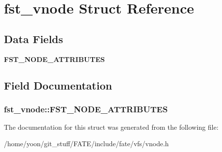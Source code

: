 \hypertarget{structfst__vnode}{\section{fst\-\_\-vnode Struct Reference}
\label{structfst__vnode}
}
\subsection*{Data Fields}
\begin{DoxyCompactItemize}
\item 
\hypertarget{structfst__vnode_a05e54cfa77aa3c8de48035e291c1b0a8}{{\bfseries F\-S\-T\-\_\-\-N\-O\-D\-E\-\_\-\-A\-T\-T\-R\-I\-B\-U\-T\-E\-S}}\label{structfst__vnode_a05e54cfa77aa3c8de48035e291c1b0a8}

\end{DoxyCompactItemize}


\subsection{Field Documentation}
\hypertarget{structfst__vnode_a05e54cfa77aa3c8de48035e291c1b0a8}{
\subsubsection[{F\-S\-T\-\_\-\-N\-O\-D\-E\-\_\-\-A\-T\-T\-R\-I\-B\-U\-T\-E\-S}]{\setlength{\rightskip}{0pt plus 5cm}fst\-\_\-vnode\-::\-F\-S\-T\-\_\-\-N\-O\-D\-E\-\_\-\-A\-T\-T\-R\-I\-B\-U\-T\-E\-S}}\label{structfst__vnode_a05e54cfa77aa3c8de48035e291c1b0a8}


The documentation for this struct was generated from the following file\-:\begin{DoxyCompactItemize}
\item 
/home/yoon/git\-\_\-stuff/\-F\-A\-T\-E/include/fate/vfs/vnode.\-h\end{DoxyCompactItemize}
